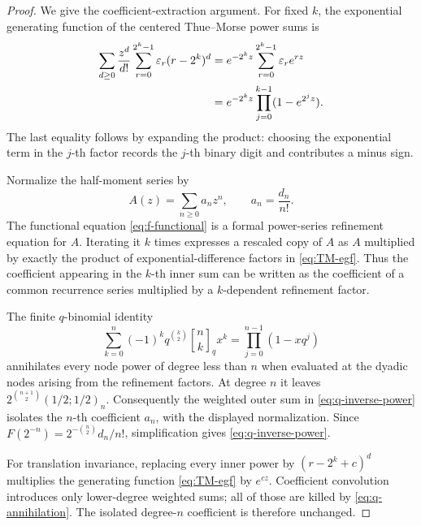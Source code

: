 \documentclass[11pt,oneside]{article}
\theoremstyle{definition}
\theoremstyle{remark}
\newcommand{\epsTM}{\varepsilon}
\newcommand{\gaussbinom}[3]{\genfrac{[}{]}{0pt}{}{#1}{#2}_{#3}}
\begin{document}
\begin{proof}
We give the coefficient-extraction argument.  For fixed $k$, the exponential
generating function of the centered Thue--Morse power sums is
\begin{align}
 \sum_{d\ge0}\frac{z^d}{d!}
   \sum_{r=0}^{2^k-1}\epsTM_r(r-2^k)^d
 &=e^{-2^kz}\sum_{r=0}^{2^k-1}\epsTM_re^{rz}\notag\\
 &=e^{-2^kz}\prod_{j=0}^{k-1}(1-e^{2^jz}).
 \label{eq:TM-egf}
\end{align}
The last equality follows by expanding the product: choosing the exponential term
in the $j$-th factor records the $j$-th binary digit and contributes a minus sign.

Normalize the half-moment series by
\begin{equation}\label{eq:recurrence-series}
 A(z)=\sum_{n\ge0}a_nz^n,
 \qquad
 a_n=\frac{d_n}{n!}.
\end{equation}
The functional equation \eqref{eq:f-functional} is a formal power-series
refinement equation for $A$.  Iterating it $k$ times expresses a rescaled copy of
$A$ as $A$ multiplied by exactly the product of exponential-difference factors in
\eqref{eq:TM-egf}.  Thus the coefficient appearing in the $k$-th inner sum can be
written as the coefficient of a common recurrence series multiplied by a
$k$-dependent refinement factor.

The finite $q$-binomial identity
\begin{equation}\label{eq:q-annihilation}
 \sum_{k=0}^{n}(-1)^kq^{\binom k2}
 \gaussbinom{n}{k}{q}x^k
 =\prod_{j=0}^{n-1}(1-xq^j)
\end{equation}
annihilates every node power of degree less than $n$ when evaluated at the dyadic
nodes arising from the refinement factors.  At degree $n$ it leaves
$2^{\binom{n+1}{2}}(1/2;1/2)_n$.  Consequently the weighted outer sum in
\eqref{eq:q-inverse-power} isolates the $n$-th coefficient $a_n$, with the displayed
normalization.  Since $F(2^{-n})=2^{-\binom n2}d_n/n!$, simplification gives
\eqref{eq:q-inverse-power}.

For translation invariance, replacing every inner power by
$(r-2^k+c)^d$ multiplies the generating function \eqref{eq:TM-egf} by $e^{cz}$.
Coefficient convolution introduces only lower-degree weighted sums; all of those
are killed by \eqref{eq:q-annihilation}.  The isolated degree-$n$ coefficient is
therefore unchanged.
\end{proof}
\end{document}
